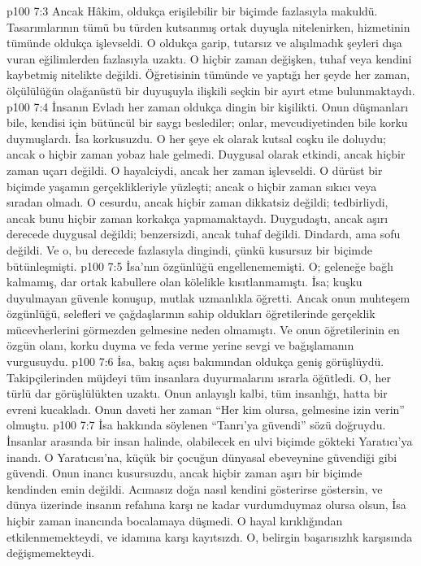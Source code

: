 \vs p100 7:3 Ancak Hâkim, oldukça erişilebilir bir biçimde fazlasıyla makuldü. Tasarımlarının tümü bu türden kutsanmış ortak duyuşla nitelenirken, hizmetinin tümünde oldukça işlevseldi. O oldukça garip, tutarsız ve alışılmadık şeyleri dışa vuran eğilimlerden fazlasıyla uzaktı. O hiçbir zaman değişken, tuhaf veya kendini kaybetmiş nitelikte değildi. Öğretisinin tümünde ve yaptığı her şeyde her zaman, ölçülülüğün olağanüstü bir duyuşuyla ilişkili seçkin bir ayırt etme bulunmaktaydı.
\vs p100 7:4 İnsanın Evladı her zaman oldukça dingin bir kişilikti. Onun düşmanları bile, kendisi için bütüncül bir saygı beslediler; onlar, mevcudiyetinden bile korku duymuşlardı. İsa korkusuzdu. O her şeye ek olarak kutsal coşku ile doluydu; ancak o hiçbir zaman yobaz hale gelmedi. Duygusal olarak etkindi, ancak hiçbir zaman uçarı değildi. O hayalciydi, ancak her zaman işlevseldi. O dürüst bir biçimde yaşamın gerçeklikleriyle yüzleşti; ancak o hiçbir zaman sıkıcı veya sıradan olmadı. O cesurdu, ancak hiçbir zaman dikkatsiz değildi; tedbirliydi, ancak bunu hiçbir zaman korkakça yapmamaktaydı. Duygudaştı, ancak aşırı derecede duygusal değildi; benzersizdi, ancak tuhaf değildi. Dindardı, ama sofu değildi. Ve o, bu derecede fazlasıyla dingindi, çünkü kusursuz bir biçimde bütünleşmişti.
\vs p100 7:5 İsa’nın özgünlüğü engellenememişti. O; geleneğe bağlı kalmamış, dar ortak kabullere olan kölelikle kısıtlanmamıştı. İsa; kuşku duyulmayan güvenle konuşup, mutlak uzmanlıkla öğretti. Ancak onun muhteşem özgünlüğü, selefleri ve çağdaşlarının sahip oldukları öğretilerinde gerçeklik mücevherlerini görmezden gelmesine neden olmamıştı. Ve onun öğretilerinin en özgün olanı, korku duyma ve feda verme yerine sevgi ve bağışlamanın vurgusuydu.
\vs p100 7:6 İsa, bakış açısı bakımından oldukça geniş görüşlüydü. Takipçilerinden müjdeyi tüm insanlara duyurmalarını ısrarla öğütledi. O, her türlü dar görüşlülükten uzaktı. Onun anlayışlı kalbi, tüm insanlığı, hatta bir evreni kucakladı. Onun daveti her zaman “Her kim olursa, gelmesine izin verin” olmuştu.
\vs p100 7:7 İsa hakkında söylenen “Tanrı’ya güvendi” sözü doğruydu. İnsanlar arasında bir insan halinde, olabilecek en ulvi biçimde gökteki Yaratıcı’ya inandı. O Yaratıcısı’na, küçük bir çocuğun dünyasal ebeveynine güvendiği gibi güvendi. Onun inancı kusursuzdu, ancak hiçbir zaman aşırı bir biçimde kendinden emin değildi. Acımasız doğa nasıl kendini gösterirse göstersin, ve dünya üzerinde insanın refahına karşı ne kadar vurdumduymaz olursa olsun, İsa hiçbir zaman inancında bocalamaya düşmedi. O hayal kırıklığından etkilenmemekteydi, ve idamına karşı kayıtsızdı. O, belirgin başarısızlık karşısında değişmemekteydi.
